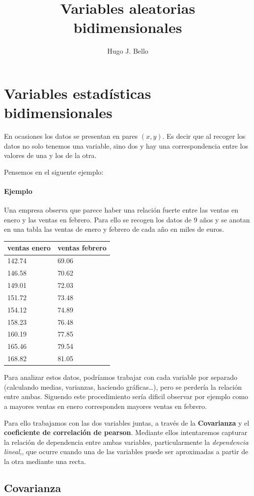 \documentclass[]{book}
\title{Variables aleatorias bidimensionales}
\author{Hugo J. Bello}
\date{}
\theoremstyle{plain}
\theoremstyle{definition}
\begin{document}
\chapter{Variables estadísticas bidimensionales}


En ocasiones los datos se presentan en pares \((x,y)\). Es decir que al
recoger los datos no solo tenemos una variable, sino dos y hay una
correspondencia entre los valores de una y los de la otra.

Pensemos en el siguente ejemplo:

\hypertarget{ejemplo}{%
\subsubsection{Ejemplo}\label{ejemplo}}

Una empresa observa que parece haber una relación fuerte entre las
ventas en enero y las ventas en febrero. Para ello se recogen los datos
de 9 años y se anotan en una tabla las ventas de enero y febrero de cada
año en miles de euros.

\begin{longtable}[]{@{}ll@{}}
\toprule
ventas enero & ventas febrero\tabularnewline
\midrule
\endhead
142.74 & 69.06\tabularnewline
146.58 & 70.62\tabularnewline
149.01 & 72.03\tabularnewline
151.72 & 73.48\tabularnewline
154.12 & 74.89\tabularnewline
158.23 & 76.48\tabularnewline
160.19 & 77.85\tabularnewline
165.46 & 79.54\tabularnewline
168.82 & 81.05\tabularnewline
\bottomrule
\end{longtable}

Para analizar estos datos, podríamos trabajar con cada variable por
separado (calculando medias, varianzas, haciendo gráficas\ldots{}), pero
se perdería la relación entre ambas. Siguendo este procedimiento sería
dificil observar por ejemplo como a mayores ventas en enero corresponden
mayores ventas en febrero.

Para ello trabajamos con las dos variables juntas, a través de la
\textbf{Covarianza} y el \textbf{coeficiente de correlación de pearson}.
Mediante ellos intentaremos capturar la relación de dependencia entre
ambas variables, particularmente la \emph{dependencia lineal,}, que
ocurre cuando una de las variables puede ser aproximadas a partir de la
otra mediante una recta.

\hypertarget{covarianza}{%
\section{Covarianza}\label{covarianza}}
\end{document}
